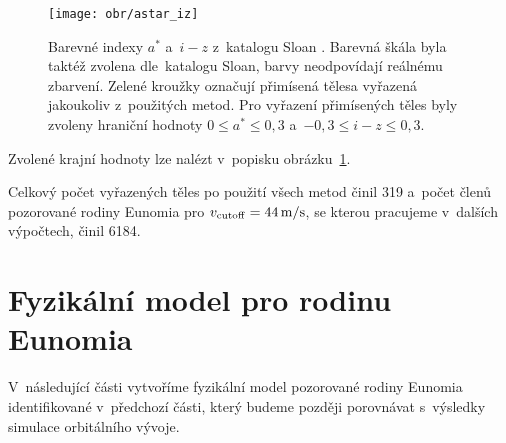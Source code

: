 \documentclass[A4paper, 12pt, oneside, openany]{book}
\begin{document}
\begin{figure}
	\centering
	\texttt{[image: obr/astar\_iz]}
	\caption{Barevné indexy $a^*$ a~$i-z$ z~katalogu Sloan \cite{ivezic01}. Barevná škála byla taktéž zvolena dle~katalogu Sloan, barvy neodpovídají reálnému zbarvení. Zelené kroužky označují přimísená tělesa vyřazená jakoukoliv z~použitých metod. Pro vyřazení přimísených těles byly zvoleny hraniční hodnoty $0\leq a^* \leq 0,3$ a~$-0,3\leq i-z \leq 0,3$.}
	\label{fig:astar_iz}
\end{figure}

Zvolené krajní hodnoty lze nalézt v~popisku obrázku~\ref{fig:astar_iz}. 

Celkový počet vyřazených těles po použití všech metod činil 319 a~počet členů pozorované rodiny Eunomia pro $v_{\rm cutoff}=44\,{\rm m/s}$, se kterou pracujeme v~dalších výpočtech, činil 6184.

\pagebreak

\section{Fyzikální model pro rodinu Eunomia}
V~následující části vytvoříme fyzikální model pozorované rodiny Eunomia identifikované v~předchozí části, který budeme později porovnávat s~výsledky simulace orbitálního vývoje.
\end{document}

